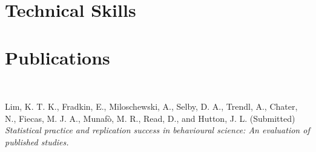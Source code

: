 \documentclass[11pt,a4paper,sans]{moderncv} %
\begin{document}
\newpage 
%
%
%


\section{Technical Skills}


\section{Publications}

\

Lim, K. T. K., Fradkin, E., Miloschewski, A., Selby, D. A., Trendl, A., Chater, N., Fiecas, M. J. A., Munafò, M. R., Read, D., and Hutton, J. L. (Submitted) \textit{Statistical practice and replication success in behavioural science: An evaluation of published studies.}

\
\end{document}
